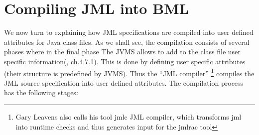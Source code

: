 

\section{Compiling JML into BML}\label{BCSLcompile}


We now turn to explaining how JML specifications are compiled into user defined attributes for Java class files.
As we shall see, the compilation consists of several phases where in the final phase 
 The JVMS allows to add to the class file user specific information(\cite{VMSpec}, ch.4.7.1). This is done by defining user specific attributes
  (their structure is predefined by JVMS).
Thus the ``JML compiler'' \footnote{Gary Leavens also calls his tool jmlc JML compiler, which transforms jml into runtime checks and thus generates input for the jmlrac tool  } compiles the JML source specification into user defined attributes. The compilation process has the following stages:
